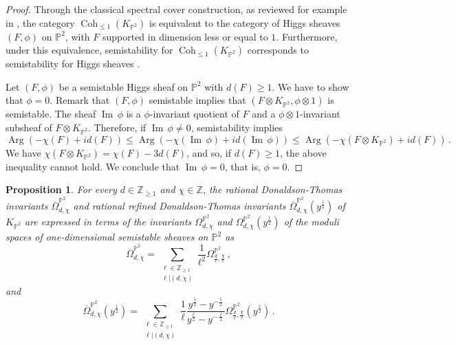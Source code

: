 \documentclass[11pt,letterpaper]{amsart}
\newtheorem{prop}[defn]{Proposition}
\newcommand\PP{\mathbb P}
\newcommand\Z{\mathbb Z}
\newcommand\Arg{\operatorname{Arg}}
\newcommand\Coh{\operatorname{Coh}}
\newcommand\Ima{\operatorname{Im}\,}
\begin{document}
\begin{proof}
Through the classical spectral cover construction, as reviewed for example in \cite[Proposition 2.2]{MR4158461}, the category $\Coh_{\leqslant 1}(K_{\PP^2})$
is equivalent to the category of Higgs sheaves $(F,\phi)$ on $\PP^2$, with $F$ supported in dimension less or equal to $1$. Furthermore, under this equivalence,
semistability for $\Coh_{\leqslant 1}(K_{\PP^2})$ corresponds to semistability for Higgs sheaves \cite[Lemma 2.9]{MR4158461}.

Let $(F,\phi)$ be a semistable Higgs sheaf on $\PP^2$ with $d(F) \geq 1$. We have to show that $\phi=0$.  Remark that $(F,\phi)$
semistable implies that $(F \otimes K_{\PP^2}, \phi \otimes 1)$ is semistable. 
The sheaf $\Ima \phi$ is a $\phi$-invariant quotient of $F$
and a $\phi \otimes 1$-invariant subsheaf of $F \otimes K_{\PP^2}$.
Therefore, if $\Ima \phi \neq 0$, semistability implies
\[ \Arg(-\chi(F)+id(F)) \leqslant \Arg(-\chi(\Ima \phi)+id(\Ima \phi))
\leqslant \Arg(-\chi(F \otimes K_{\PP^2})+id(F))\,.\]
We have $\chi(F\otimes K_{\PP^2})=\chi(F)-3d(F)$, and so, if $d(F) \geq 1$, the above inequality cannot hold.
We conclude that $\Ima \phi=0$, that is, $\phi=0$.

\end{proof}

\begin{prop} \label{prop_joyce_song}
For every $d \in \Z_{\geqslant 1}$ and 
$\chi \in \Z$, the rational Donaldson-Thomas invariants $\overline{\Omega}_{d,\chi}^{\PP^2}$
and rational refined Donaldson-Thomas invariants $\overline{\Omega}_{d,\chi}^{\PP^2}(y^{\frac{1}{2}})$
of $K_{\PP^2}$
are expressed in terms of the invariants 
$\Omega_{d,\chi}^{\PP^2}$
and $\Omega_{d,\chi}^{\PP^2}(y^{\frac{1}{2}})$ of the moduli spaces of one-dimensional semistable sheaves on $\PP^2$ as
\[ \overline{\Omega}_{d,\chi}^{\PP^2}
=\sum_{\substack{\ell \in \Z_{\geqslant 1}
\\ \ell|(d,\chi)}}
\frac{1}{\ell^2}
\Omega_{\frac{d}{\ell},\frac{\chi}{\ell}}^{\PP^2} \,,\]
and 
\[ \overline{\Omega}_{d,\chi}^{\PP^2}(y^{\frac{1}{2}})=
\sum_{\substack{\ell\in \Z_{\geqslant 1} \\\ell|(d,\chi)}}
\frac{1}{\ell} \frac{y^{\frac{1}{2}}-y^{-\frac{1}{2}}}{y^{\frac{\ell}{2}}-y^{-\frac{\ell}{2}}} \Omega_{\frac{d}{\ell},\frac{\chi}{\ell}}^{\PP^2}(y^{\frac{\ell}{2}})\,.\]
\end{prop}
\end{document}
